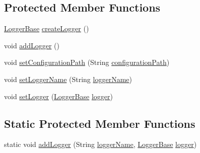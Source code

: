 \subsection*{Protected Member Functions}
\begin{DoxyCompactItemize}
\item 
\hyperlink{classit_1_1emarolab_1_1cagg_1_1debugging_1_1DebuggingText_1_1LoggerBase}{Logger\-Base} \hyperlink{classit_1_1emarolab_1_1cagg_1_1debugging_1_1DebuggingText_ae1db7e027b1295c50d9afa8aeabc453b}{create\-Logger} ()
\item 
void \hyperlink{classit_1_1emarolab_1_1cagg_1_1debugging_1_1DebuggingText_aa80c0f8c618c11bfa7a7449739224fc7}{add\-Logger} ()
\item 
void \hyperlink{classit_1_1emarolab_1_1cagg_1_1debugging_1_1DebuggingText_af290c36f2c92cfc66387dd3f6fdccd53}{set\-Configuration\-Path} (String \hyperlink{classit_1_1emarolab_1_1cagg_1_1debugging_1_1DebuggingText_a4e65225034622175b3378a1a7b7c311b}{configuration\-Path})
\item 
void \hyperlink{classit_1_1emarolab_1_1cagg_1_1debugging_1_1DebuggingText_a9d3a7ed2d5177c7f8513cba4bdc3c998}{set\-Logger\-Name} (String \hyperlink{classit_1_1emarolab_1_1cagg_1_1debugging_1_1DebuggingText_afa1175bdb0c7a658affe0b25a8a924c3}{logger\-Name})
\item 
void \hyperlink{classit_1_1emarolab_1_1cagg_1_1debugging_1_1DebuggingText_afbc675f65a800fe7a7d279b077908534}{set\-Logger} (\hyperlink{classit_1_1emarolab_1_1cagg_1_1debugging_1_1DebuggingText_1_1LoggerBase}{Logger\-Base} \hyperlink{classit_1_1emarolab_1_1cagg_1_1debugging_1_1DebuggingText_aa7afec4cc4e3688d720b5ee81a59aa0e}{logger})
\end{DoxyCompactItemize}
\subsection*{Static Protected Member Functions}
\begin{DoxyCompactItemize}
\item 
static void \hyperlink{classit_1_1emarolab_1_1cagg_1_1debugging_1_1DebuggingText_a0c828078e848fa50c78062b57f3fb474}{add\-Logger} (String \hyperlink{classit_1_1emarolab_1_1cagg_1_1debugging_1_1DebuggingText_afa1175bdb0c7a658affe0b25a8a924c3}{logger\-Name}, \hyperlink{classit_1_1emarolab_1_1cagg_1_1debugging_1_1DebuggingText_1_1LoggerBase}{Logger\-Base} \hyperlink{classit_1_1emarolab_1_1cagg_1_1debugging_1_1DebuggingText_aa7afec4cc4e3688d720b5ee81a59aa0e}{logger})
\end{DoxyCompactItemize}
